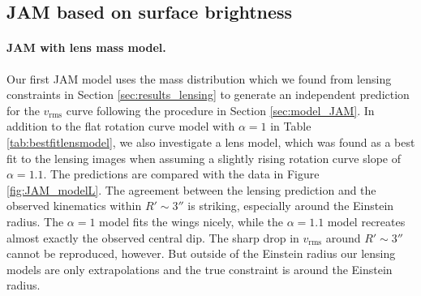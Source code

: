 \subsection{JAM based on surface brightness} \label{sec:results_JAM_SB}

\paragraph{JAM with lens mass model.} Our first JAM model uses the mass distribution which we found from lensing constraints in Section \ref{sec:results_lensing} to generate an independent prediction for the $v_\text{rms}$ curve following the procedure in Section \ref{sec:model_JAM}. In addition to the flat rotation curve model with $\alpha = 1$ in Table \ref{tab:bestfitlensmodel}, we also investigate a lens model, which was found as a best fit to the lensing images when assuming a slightly rising rotation curve slope of $\alpha=1.1$. The predictions are compared with the data in Figure \ref{fig:JAM_modelL}. The agreement between the lensing prediction and the observed kinematics within $R' \sim 3''$ is striking, especially around the Einstein radius. The $\alpha = 1$ model fits the wings nicely, while the $\alpha = 1.1$ model recreates almost exactly the observed central dip. The sharp drop in $v_\text{rms}$ around $R' \sim 3''$ cannot be reproduced, however. But outside of the Einstein radius our lensing models are only extrapolations and the true constraint is around the Einstein radius.


